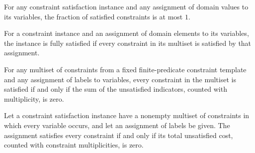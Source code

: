 \begin{theorem}
\label{FABL.CSPInstance.value_le_one}
\leanok
{}
For any constraint satisfaction instance and any assignment of domain values to its
variables, the fraction of satisfied constraints is at most $1$.
\end{theorem}

\begin{definition}
\label{FABL.CSPInstance.FullySatisfied}
\leanok
{}
For a constraint instance and an assignment of domain elements to its variables, the
instance is fully satisfied if every constraint in its multiset is satisfied by that
assignment.
\end{definition}

\begin{theorem}
\label{FABL.CSPInstance.forall_satisfied_iff_sum_unsatisfied_eq_zero}
\leanok
{}
For any multiset of constraints from a fixed finite-predicate constraint template and
any assignment of labels to variables, every constraint in the multiset is satisfied if
and only if the sum of the unsatisfied indicators, counted with multiplicity, is zero.
\end{theorem}

\begin{theorem}
\label{FABL.CSPInstance.fullySatisfied_iff_unsatisfiedCost_eq_zero}
\leanok
{}
Let a constraint satisfaction instance have a nonempty multiset of constraints in which
every variable occurs, and let an assignment of labels be given. The assignment
satisfies every constraint if and only if its total unsatisfied cost, counted with
constraint multiplicities, is zero.
\end{theorem}

